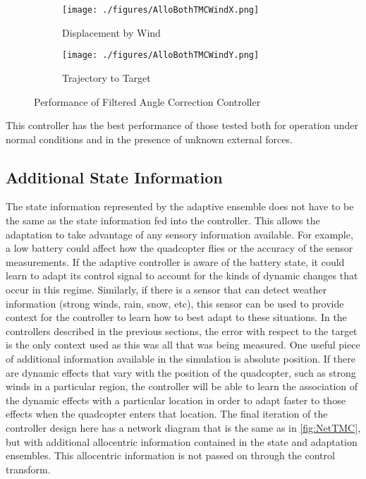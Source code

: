 \documentclass[letterpaper,12pt,titlepage,oneside,final]{book}
\begin{document}
\begin{figure}
\centering
\begin{subfigure}[t]{0.48\textwidth}
\texttt{[image: ./figures/AlloBothTMCWindX.png]} %
\caption{Displacement by Wind}
\end{subfigure}
\begin{subfigure}[t]{0.48\textwidth}
\texttt{[image: ./figures/AlloBothTMCWindY.png]}
\caption{Trajectory to Target}
\end{subfigure}
\caption{Performance of Filtered Angle Correction Controller}
\label{fig:PlotTMC}
\end{figure}

This controller has the best performance of those tested both for operation under normal conditions and in the presence of unknown external forces.

\subsection{Additional State Information}

The state information represented by the adaptive ensemble does not have to be the same as the state information fed into the controller.
This allows the adaptation to take advantage of any sensory information available.
For example, a low battery could affect how the quadcopter flies or the accuracy of the sensor measurements. If the adaptive controller is aware of the battery state, it could learn to adapt its control signal to account for the kinds of dynamic changes that occur in this regime.
Similarly, if there is a sensor that can detect weather information (strong winds, rain, snow, etc), this sensor can be used to provide context for the controller to learn how to best adapt to these situations.
In the controllers described in the previous sections, the error with respect to the target is the only context used as this was all that was being measured.
One useful piece of additional information available in the simulation is absolute position.
If there are dynamic effects that vary with the position of the quadcopter, such as strong winds in a particular region, the controller will be able to learn the association of the dynamic effects with a particular location in order to adapt faster to those effects when the quadcopter enters that location.
The final iteration of the controller design here has a network diagram that is the same as in \autoref{fig:NetTMC}, but with additional allocentric information contained in the state and adaptation ensembles. This allocentric information is not passed on through the control transform.
\end{document}
